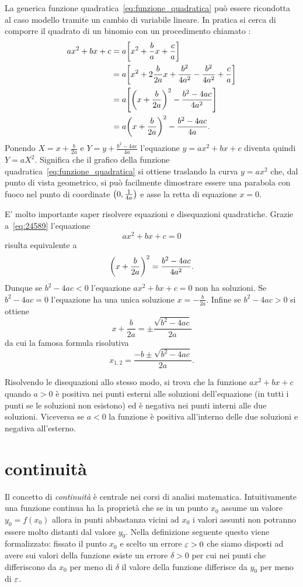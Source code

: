 La generica funzione quadratica~\eqref{eq:funzione_quadratica}
può essere ricondotta al caso modello tramite un cambio
di variabile lineare. In pratica si cerca di comporre il quadrato
di un binomio con un procedimento chiamato
:
\begin{equation}\label{eq:24589}
\begin{aligned}
ax^2+bx+c
  &= a {\left[ x^2+\frac b a x + \frac c a \right]}\\
  &= a {\left[ x^2+2 \frac{b}{2a} x + \frac{b^2}{4a^2} - \frac{b^2}{4a^2} + \frac c a \right]}\\
  &= a {\left[ {\left( x+\frac{b}{2a} \right)}^2 - \frac{b^2-4ac}{4a^2} \right]} \\
  &= a{\left( x+\frac b{2a} \right)}^2  - \frac{b^2-4ac}{4a}.
\end{aligned}
\end{equation}
Ponendo $X=x+\frac b{2a}$ e $Y=y+\frac{b^2-4ac}{4a}$
l'equazione $y=ax^2+bx+c$ diventa quindi $Y=aX^2$. Significa
che il grafico della funzione quadratica~\eqref{eq:funzione_quadratica}
si ottiene traslando la curva $y=a x^2$ che, dal punto di vista
geometrico, si può facilmente
dimostrare essere una parabola con fuoco
nel punto di coordinate ${\left( 0,\frac 1 {4a} \right)}$
e asse la retta di equazione $x=0$.

E' molto importante saper risolvere equazioni e disequazioni
quadratiche. Grazie a~\eqref{eq:24589} l'equazione
\[
 a x^2 + bx + c = 0
\]
risulta equivalente a
\[
  {\left( x+\frac{b}{2a} \right)}^2 = \frac{b^2-4ac}{4a^2}.
\]
Dunque se $b^2-4ac<0$ l'equazione $ax^2+bx+c=0$ non ha soluzioni.
Se $b^2-4ac=0$ l'equazione ha una unica soluzione $x=-\frac{b}{2a}$.
Infine se $b^2-4ac>0$ si ottiene
\[
  x+\frac b{2a} = \pm \frac{\sqrt{b^2-4ac}}{2a}
\]
da cui la famosa formula risolutiva
\mymark{***}
\[
  x_{1,2} = \frac{-b \pm \sqrt{b^2-4ac}}{2a}.
\]

Risolvendo le disequazioni allo stesso modo, si trova
che la funzione $ax^2+bx+c$ quando $a>0$ è positiva
nei punti esterni alle soluzioni dell'equazione
(in tutti i punti se le soluzioni non esistono) ed
è negativa nei punti interni alle due soluzioni.
Viceversa se $a<0$ la funzione è positiva all'interno
delle due soluzioni e negativa all'esterno.

\section{continuità}

Il concetto di \emph{continuità} è centrale
nei corsi di analisi matematica.
Intuitivamente una funzione continua ha la proprietà
che se in un punto $x_0$ assume un valore $y_0=f(x_0)$ allora
in punti abbastanza vicini ad $x_0$ i valori assunti
non potranno essere molto distanti dal valore $y_0$.
Nella definizione seguente questo viene formalizzato:
fissato il punto $x_0$ e scelto un errore $\varepsilon>0$
che siamo disposti ad avere sui valori della funzione
esiste un errore $\delta>0$ per cui nei punti
che differiscono da $x_0$ per meno di $\delta$ il valore
della funzione differisce da $y_0$ per meno di $\varepsilon$.

